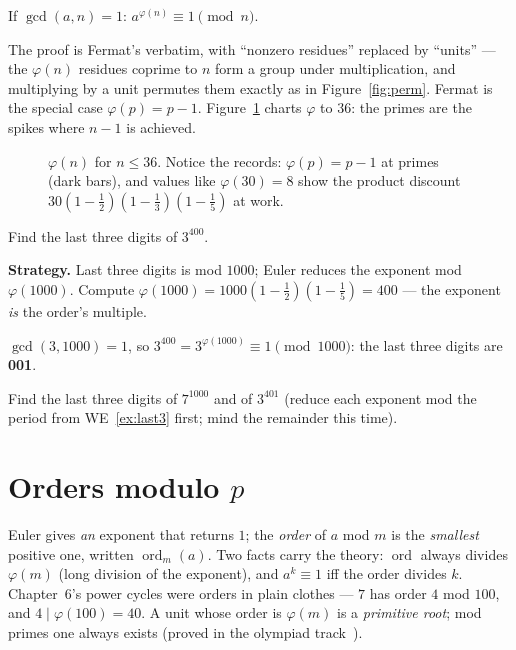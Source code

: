 \begin{theorem}[Euler]\label{thm:euler}
If $\gcd(a, n) = 1$: $a^{\varphi(n)} \equiv 1 \pmod n$.
\end{theorem}

The proof is Fermat's verbatim, with ``nonzero residues'' replaced by
``units'' --- the $\varphi(n)$ residues coprime to $n$ form a group under
multiplication, and multiplying by a unit permutes them exactly as in
Figure~\ref{fig:perm}. Fermat is the special case $\varphi(p) = p - 1$.
Figure~\ref{fig:totient} charts $\varphi$ to $36$: the primes are the
spikes where $n-1$ is achieved.

\begin{figure}[ht]\centering

\caption{$\varphi(n)$ for $n \le 36$. Notice the records: $\varphi(p) =
p-1$ at primes (dark bars), and values like $\varphi(30) = 8$ show the
product discount $30(1-\tfrac12)(1-\tfrac13)(1-\tfrac15)$ at work.}
\label{fig:totient}
\end{figure}

\begin{example}\label{ex:last3}
Find the last three digits of $3^{400}$.
\par\smallskip
\textbf{Strategy.} Last three digits is mod $1000$; Euler reduces the
exponent mod $\varphi(1000)$. Compute $\varphi(1000) = 1000(1 -
\tfrac12)(1 - \tfrac15) = 400$ --- the exponent \emph{is} the order's
multiple.
\par\smallskip
\begin{solution}
$\gcd(3, 1000) = 1$, so $3^{400} = 3^{\varphi(1000)} \equiv 1
\pmod{1000}$: the last three digits are \textbf{001}.
\end{solution}
\end{example}

\begin{exercise}[medium]\label{exr:euler}
Find the last three digits of $7^{1000}$ and of $3^{401}$ (reduce each
exponent mod the period from WE~\ref{ex:last3} first; mind the
remainder this time).
\end{exercise}

\section{Orders modulo $p$}\label{sec:orders}

Euler gives \emph{an} exponent that returns $1$; the \emph{order} of $a$
mod $m$ is the \emph{smallest} positive one, written $\operatorname{ord}_m(a)$.
Two facts carry the theory: $\operatorname{ord}$ always divides
$\varphi(m)$ (long division of the exponent), and $a^k \equiv 1$ iff the
order divides $k$. Chapter~6's power cycles were orders in plain clothes
--- $7$ has order $4$ mod $100$, and $4 \mid \varphi(100) = 40$. A unit
whose order is $\varphi(m)$ is a \emph{primitive root}; mod primes one
always exists (proved in the olympiad track~\cite{zhao}).

